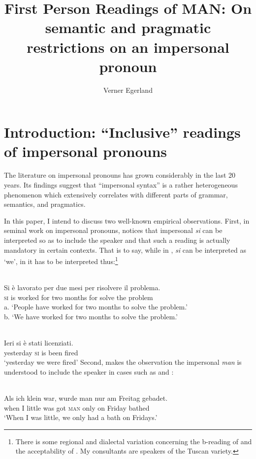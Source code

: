 \documentclass[output=paper]{LSP/langsci}
\author{Verner Egerland\affiliation{Lund University}
}
\title{First Person Readings of MAN: On semantic and pragmatic restrictions on an impersonal pronoun}
\begin{document}
 

\section{Introduction: “Inclusive” readings of impersonal pronouns}\label{sec:egerland:1}

The literature on impersonal pronouns has grown considerably in the last 20 years. Its findings suggest that “impersonal syntax” is a rather heterogeneous phenomenon which extensively correlates with different parts of grammar, semantics, and pragmatics.

In this paper, I intend to discuss two well-known empirical observations. First, in seminal work on impersonal pronouns, \citet{Cinque1988} notices that  impersonal \textit{si} can be interpreted so as to include the speaker and that such a reading is actually mandatory in certain contexts. That is to say, while in , \textit{si} can be interpreted as ‘we’, in  it has to be interpreted thus:\footnote{There is some regional and dialectal variation concerning the b-reading of  and the acceptability of . My  consultants are speakers of the Tuscan variety.}

\ea\label{ex:egerland:1}
\\
\gll Si  è  lavorato  per  due  mesi    per  risolvere    il    problema.\\
    \textsc{si}  is   worked  for    two  months  for    solve      the  problem\\
\glt a. ‘People have worked for two months to solve the problem.’\\
     b. ‘We have worked for two months to solve the problem.’
\z

\ea\label{ex:egerland:2}
\\
\gll Ieri      si  è  stati  licenziati.\\
     yesterday  \textsc{si}  is   been  fired\\
\glt ‘yesterday we were fired’
\z
Second, \citet{Kratzer1997,Kratzer2000} makes the observation the  impersonal \textit{man} is understood to include the speaker in cases such as  and :

\ea\label{ex:egerland:3}
\\
\gll Als   ich  klein  war,  wurde  man  nur  am  Freitag  gebadet. \\
     when  I     little  was   got     \textsc{man}  only  on    Friday  bathed\\
\glt ‘When I was little, we only had a bath on Fridays.’
\z
\end{document}
